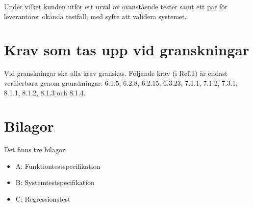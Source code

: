 \documentclass[a4paper]{article}
\begin{document}
Under vilket kunden utför ett urval av ovanstående tester samt ett par för leverantörer okända testfall, med syfte att validera systemet.

\section{Krav som tas upp vid granskningar}


Vid granskningar ska alla krav granskas.
Följande krav (i Ref.1) är endast verifierbara genom granskningar: 6.1.5, 6.2.8, 6.2.15, 6.3.23, 7.1.1, 7.1.2, 7.3.1, 8.1.1, 8.1.2, 8.1.3 och 8.1.4.

\section{Bilagor}

Det finns tre bilagor:

\begin{itemize}
\item A: Funktiontestspecifikation
\item B: Systemtestspecifikation
\item C: Regressionstest

\end{itemize}

\newpage
\end{document}
